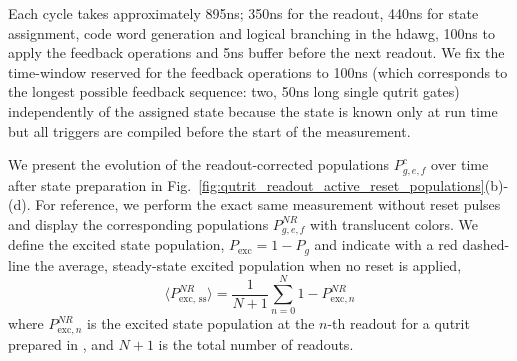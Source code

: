 Each cycle takes approximately 895\unit{ns}; 350\unit{ns} for the readout, 440\unit{ns} for state assignment, code word generation and logical branching in the \gls{hdawg}, 100\unit{ns} to apply the feedback operations  and 5\unit{ns} buffer before the next readout. We fix the time-window reserved for the feedback operations to 100\unit{ns} (which corresponds to the longest possible feedback sequence: two, 50\unit{ns} long single qutrit gates) independently of the assigned state because the state is known only at run time but all triggers are compiled before the start of the measurement.

We present the evolution of the readout-corrected populations $P_{g,e,f}^c$ over time after state preparation in  Fig.~\ref{fig:qutrit_readout_active_reset_populations}(b)-(d).
For reference, we perform the exact same measurement without reset pulses and display the corresponding populations $P_{g,e,f}^{NR}$ with translucent colors. We define the excited state population, $P_\textrm{exc} = 1 - P_g$ and indicate with a red dashed-line the average, steady-state excited population when no reset is applied,
\begin{equation}
    \langle P_{\textrm{exc, ss}}^{NR}\rangle = \frac{1}{N+1}\sum_{n=0}^{N} 1-P_{\textrm{exc},n}^{NR}
\end{equation}
where $P_{\textrm{exc},n}^{NR}$ is the excited state population at the $n$-th readout for a qutrit prepared in \g{}, and $N+1$ is the total number of readouts.

